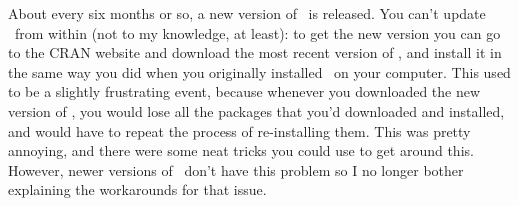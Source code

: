 About every six months or so, a new version of \R\ is released. You can't update \R\ from within \Rstudio (not to my knowledge, at least): to get the new version you can go to the CRAN website and download the most recent version of \R, and install it in the same way you did when you originally installed \R\ on your computer. This used to be a slightly frustrating event, because whenever you downloaded the new version of \R, you would lose all the packages that you'd downloaded and installed, and would have to repeat the process of re-installing them. This was pretty annoying, and there were some neat tricks you could use to get around this. However, newer versions of \R\ don't have this problem so I no longer bother explaining the workarounds for that issue.
%
%
%
%
%


